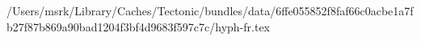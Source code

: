 /Users/msrk/Library/Caches/Tectonic/bundles/data/6ffe055852f8faf66c0acbe1a7fb27f87b869a90bad1204f3bf4d9683f597c7c/hyph-fr.tex
